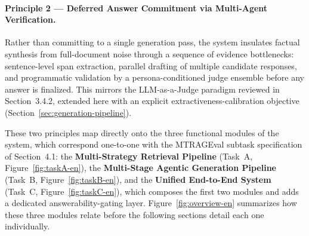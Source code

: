\paragraph{Principle 2 --- Deferred Answer Commitment via Multi-Agent Verification.}
Rather than committing to a single generation pass, the system insulates factual synthesis from full-document noise through a sequence of evidence bottlenecks: sentence-level span extraction, parallel drafting of multiple candidate responses, and programmatic validation by a persona-conditioned judge ensemble before any answer is finalized. This mirrors the LLM-as-a-Judge paradigm reviewed in Section~3.4.2, extended here with an explicit extractiveness-calibration objective (Section~\ref{sec:generation-pipeline}).

These two principles map directly onto the three functional modules of the system, which correspond one-to-one with the MTRAGEval subtask specification of Section~4.1: the \textbf{Multi-Strategy Retrieval Pipeline} (Task~A, Figure~\ref{fig:taskA-en}), the \textbf{Multi-Stage Agentic Generation Pipeline} (Task~B, Figure~\ref{fig:taskB-en}), and the \textbf{Unified End-to-End System} (Task~C, Figure~\ref{fig:taskC-en}), which composes the first two modules and adds a dedicated answerability-gating layer. Figure~\ref{fig:overview-en} summarizes how these three modules relate before the following sections detail each one individually.

